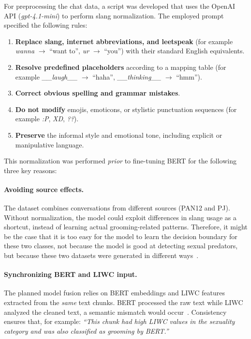 For preprocessing the chat data, a script was developed that uses the OpenAI API (\textit{gpt-4.1-mini}) to perform slang normalization. The employed prompt specified the following rules:
\begin{enumerate}
    \item \textbf{Replace slang, internet abbreviations, and leetspeak} (for example \textit{wanna} $\rightarrow$ ``want to'', \textit{ur} $\rightarrow$ ``you'') with their standard English equivalents.
    \item \textbf{Resolve predefined placeholders} according to a mapping table (for example \textit{\_\_laugh\_\_} $\rightarrow$ ``haha'', \textit{\_\_thinking\_\_} $\rightarrow$ ``hmm'').
    \item \textbf{Correct obvious spelling and grammar mistakes}.
    \item \textbf{Do not modify} emojis, emoticons, or stylistic punctuation sequences (for example \textit{:P}, \textit{XD}, \textit{??}).
    \item \textbf{Preserve} the informal style and emotional tone, including explicit or manipulative language.
\end{enumerate}

This normalization was performed \emph{prior} to fine-tuning BERT for the following three key reasons:

\paragraph{Avoiding source effects.}  
The dataset combines conversations from different sources (PAN12 and PJ). Without normalization, the model could exploit differences in slang usage as a shortcut, instead of learning actual grooming-related patterns. Therefore, it might be the case that it is too easy for the model to learn the decision boundary for these two classes, not because the model is good at detecting sexual predators, but because these two datasets were generated in different ways~\cite{schlaepfer2022online}.

\paragraph{Synchronizing BERT and LIWC input.}  
The planned model fusion relies on BERT embeddings and LIWC features extracted from the \emph{same} text chunks. BERT processed the raw text while LIWC analyzed the cleaned text, a semantic mismatch would occur~\cite{he2021deberta}. Consistency ensures that, for example:  
\textit{``This chunk had high LIWC values in the sexuality category and was also classified as grooming by BERT.''}
 
